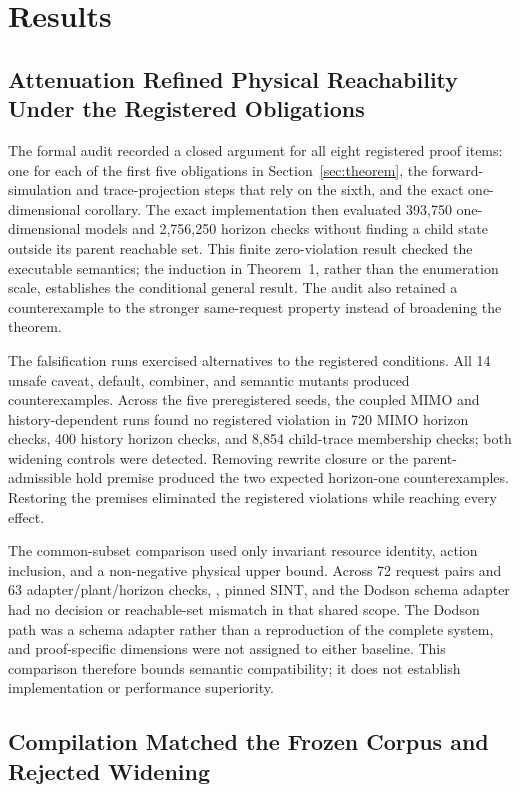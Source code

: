 \section{Results}
\label{sec:results}

\subsection{Attenuation Refined Physical Reachability Under the Registered Obligations}

The formal audit recorded a closed argument for all eight registered proof items: one for each of the first five obligations in Section~\ref{sec:theorem}, the forward-simulation and trace-projection steps that rely on the sixth, and the exact one-dimensional corollary. The exact implementation then evaluated 393,750 one-dimensional models and 2,756,250 horizon checks without finding a child state outside its parent reachable set. This finite zero-violation result checked the executable semantics; the induction in Theorem~1, rather than the enumeration scale, establishes the conditional general result. The audit also retained a counterexample to the stronger same-request property instead of broadening the theorem.

The falsification runs exercised alternatives to the registered conditions. All 14 unsafe caveat, default, combiner, and semantic mutants produced counterexamples. Across the five preregistered seeds, the coupled MIMO and history-dependent runs found no registered violation in 720 MIMO horizon checks, 400 history horizon checks, and 8,854 child-trace membership checks; both widening controls were detected. Removing rewrite closure or the parent-admissible hold premise produced the two expected horizon-one counterexamples. Restoring the premises eliminated the registered violations while reaching every effect.

The common-subset comparison used only invariant resource identity, action inclusion, and a non-negative physical upper bound. Across 72 request pairs and 63 adapter/plant/horizon checks, \zonecap{}, pinned SINT, and the Dodson schema adapter had no decision or reachable-set mismatch in that shared scope. The Dodson path was a schema adapter rather than a reproduction of the complete system, and proof-specific dimensions were not assigned to either baseline. This comparison therefore bounds semantic compatibility; it does not establish implementation or performance superiority.

\subsection{Compilation Matched the Frozen Corpus and Rejected Widening}

